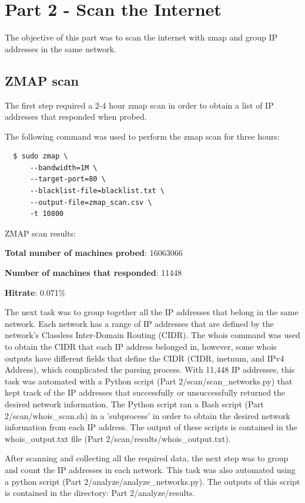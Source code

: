 \documentclass[11pt]{article}
\begin{document}
\section*{Part 2 - Scan the Internet}
\label{sec:part-2}
The objective of this part was to scan the internet with zmap and group IP addresses in the same network.
\subsection*{ZMAP scan}
The first step required a 2-4 hour zmap scan in order to obtain a list of IP addresses that responded when probed.

The following command was used to perform the zmap scan for three hours:
\begin{verbatim}
  $ sudo zmap \
      --bandwidth=1M \
      --target-port=80 \
      --blacklist-file=blacklist.txt \
      --output-file=zmap_scan.csv \
      -t 10800
\end{verbatim}
ZMAP scan results:

\textbf{Total number of machines probed}: 16063066

\textbf{Number of machines that responded}: 11448

\textbf{Hitrate}: 0.071\%
\newline

The next task was to group together all the IP addresses that belong in the same network.
Each network has a range of IP addresses that are defined by the network's Classless Inter-Domain Routing (CIDR).
The whois command was used to obtain the CIDR that each IP address belonged in, however,
some whois outputs have different fields that define the CIDR (CIDR, inetnum, and IPv4 Address), which complicated the parsing process.
With 11,448 IP addresses, this task was automated with a Python script (Part 2/scan/scan\_networks.py) that kept track of the IP addresses that successfully or unsuccessfully returned the desired network information.
The Python script ran a Bash script (Part 2/scan/whois\_scan.sh) in a 'subprocess' in order to obtain the desired network information from each IP address.
The output of these scripts is contained in the whois\_output.txt file (Part 2/scan/results/whois\_output.txt).

After scanning and collecting all the required data, the next step was to group and count the IP addresses in each network.
This task was also automated using a python script (Part 2/analyze/analyze\_networks.py). 
The outputs of this script is contained in the directory: Part 2/analyze/results.
\end{document}

